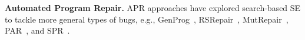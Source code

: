 \textbf{Automated Program Repair.}
APR approaches have explored search-based SE to tackle more general
types of bugs, e.g., GenProg~\cite{le2011genprog},
RSRepair~\cite{qi2014strength}, MutRepair~\cite{martinez2016astor},
PAR~\cite{kim2013automatic}, and SPR~\cite{long2015staged}.
%
%
